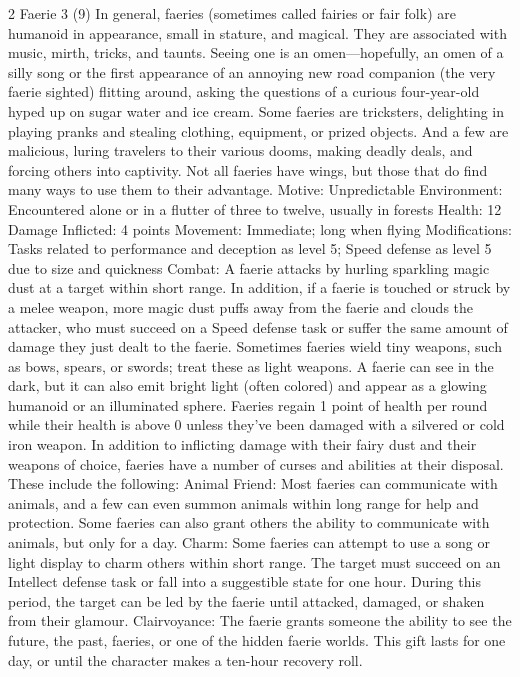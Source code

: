 \begin{multicols}{2}
Faerie 3 (9)
In general, faeries (sometimes called fairies or fair folk) are humanoid in appearance, small in stature, and magical. They are associated with music, mirth, tricks, and taunts. Seeing one is an omen—hopefully, an omen of a silly song or the first appearance of an annoying new road companion (the very faerie sighted) flitting around, asking the questions of a curious four-year-old hyped up on sugar water and ice cream. Some faeries are tricksters, delighting in playing pranks and stealing clothing, equipment, or prized objects. And a few are malicious, luring travelers to their various dooms, making deadly deals, and forcing others into captivity.
	Not all faeries have wings, but those that do find many ways to use them to their advantage.
Motive: Unpredictable
Environment: Encountered alone or in a flutter of three to twelve, usually in forests Health: 12
Damage Inflicted: 4 points
Movement: Immediate; long when flying
Modifications: Tasks related to performance and deception as level 5; Speed defense as
level 5 due to size and quickness
Combat: A faerie attacks by hurling sparkling magic dust at a target within short range. In
addition, if a faerie is touched or struck by a melee weapon, more magic dust puffs away from the faerie and clouds the attacker, who must succeed on a Speed defense task or suffer the same amount of damage they just dealt to the faerie. Sometimes faeries wield tiny weapons, such as bows, spears, or swords; treat these as light weapons.
A faerie can see in the dark, but it can also emit bright light (often colored) and appear as a glowing humanoid or an illuminated sphere.
Faeries regain 1 point of health per round while their health is above 0 unless they’ve been damaged with a silvered or cold iron weapon.
In addition to inflicting damage with their fairy dust and their weapons of choice, faeries have a number of curses and abilities at their disposal. These include the following:
Animal Friend: Most faeries can communicate with animals, and a few can even summon animals within long range for help and protection. Some faeries can also grant others the ability to communicate with animals, but only for a day.
Charm: Some faeries can attempt to use a song or light display to charm others within short range. The target must succeed on an Intellect defense task or fall into a suggestible state for one hour. During this period, the target can be led by the faerie until attacked, damaged, or shaken from their glamour.
Clairvoyance: The faerie grants someone the ability to see the future, the past, faeries, or one of the hidden faerie worlds. This gift lasts for one day, or until the character makes a ten-hour recovery roll.

\end{multicols}
